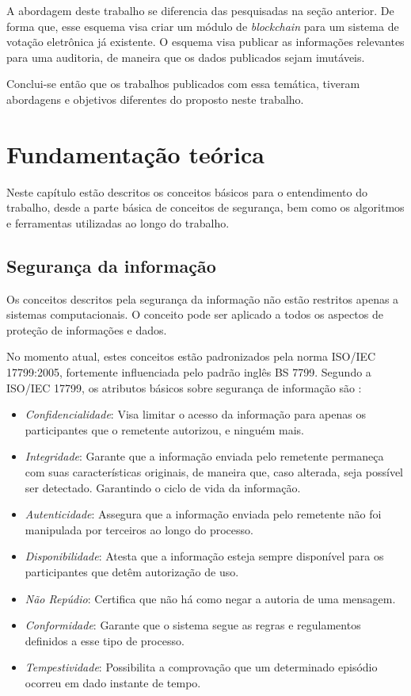 \documentclass{ufsctex/ufsctex}
\begin{document}
A abordagem deste trabalho se diferencia das pesquisadas na seção anterior. De
forma que, esse esquema visa criar um módulo de \textit{blockchain} para um
sistema de votação eletrônica já existente. O esquema visa publicar as
informações relevantes para uma auditoria, de maneira que os dados publicados
sejam imutáveis.

Conclui-se então que os trabalhos publicados com essa temática, tiveram
abordagens e objetivos diferentes do proposto neste trabalho. 

\chapter{Fundamentação teórica}

Neste capítulo estão descritos os conceitos básicos para o entendimento do
trabalho, desde a parte básica de conceitos de segurança, bem como os
algoritmos e ferramentas utilizadas ao longo do trabalho.

\section{Segurança da informação}

Os conceitos descritos pela segurança da informação não estão restritos apenas
a sistemas computacionais. O conceito pode ser aplicado a todos os aspectos de
proteção de informações e dados.

No momento atual, estes conceitos estão padronizados pela norma ISO/IEC
17799:2005, fortemente influenciada pelo padrão inglês BS 7799.
Segundo a ISO/IEC 17799, os atributos básicos sobre segurança de informação
são \cite{ISO17799}:

\begin{itemize}
	\item \textit{Confidencialidade}: Visa limitar o acesso da informação para
		apenas os participantes que o remetente autorizou, e ninguém mais.
	\item \textit{Integridade}: Garante que a informação enviada pelo remetente
		permaneça com suas características originais, de maneira que, caso
		alterada, seja possível ser detectado. Garantindo o ciclo de vida da
		informação.
	\item \textit{Autenticidade}: Assegura que a informação enviada pelo
		remetente não foi manipulada por terceiros ao longo do processo.
	\item \textit{Disponibilidade}: Atesta que a informação esteja sempre
		disponível para os participantes que detêm autorização de uso.
	\item \textit{Não Repúdio}: Certifica que não há como negar a autoria de
		uma mensagem.
	\item \textit{Conformidade}: Garante que o sistema segue as regras e
		regulamentos definidos a esse tipo de processo.
	\item \textit{Tempestividade}: Possibilita a comprovação que um determinado
		episódio ocorreu em dado instante de tempo.
\end{itemize}
\end{document}
